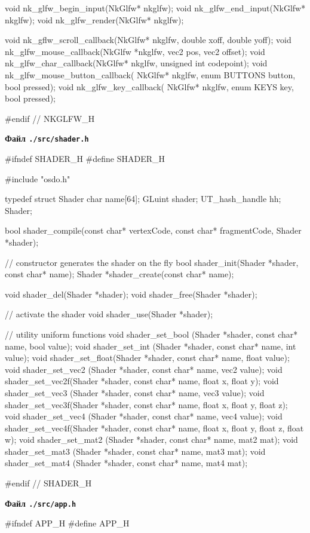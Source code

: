 \begin{multicols}{2}
\begin{ccode}
void nk_glfw_begin_input(NkGlfw* nkglfw);
void nk_glfw_end_input(NkGlfw* nkglfw);
void nk_glfw_render(NkGlfw* nkglfw);

void nk_gflw_scroll_callback(NkGlfw* nkglfw, double xoff, double yoff);
void nk_glfw_mouse_callback(NkGlfw *nkglfw, vec2 pos, vec2 offset);
void nk_glfw_char_callback(NkGlfw* nkglfw, unsigned int codepoint);
void nk_glfw_mouse_button_callback(
        NkGlfw* nkglfw, enum BUTTONS button, bool pressed);
void nk_glfw_key_callback(
        NkGlfw* nkglfw, enum KEYS key, bool pressed);

#endif // NKGLFW_H
\end{ccode}
\noindent\cprotect\textbf{Файл \verb+./src/shader.h+}
\begin{ccode}
#ifndef SHADER_H
#define SHADER_H

#include "osdo.h"

typedef struct Shader {
    char name[64];
    GLuint shader;
    UT_hash_handle hh;
} Shader;

bool shader_compile(const char* vertexCode, const char* fragmentCode,
                    Shader *shader);

// constructor generates the shader on the fly
bool shader_init(Shader *shader, const char* name);
Shader *shader_create(const char* name);

void shader_del(Shader *shader);
void shader_free(Shader *shader);

// activate the shader
void shader_use(Shader *shader);

// utility uniform functions
void shader_set_bool (Shader *shader, const char* name, bool value);
void shader_set_int  (Shader *shader, const char* name, int value);
void shader_set_float(Shader *shader, const char* name, float value);
void shader_set_vec2 (Shader *shader, const char* name, vec2 value);
void shader_set_vec2f(Shader *shader, const char* name,
                      float x, float y);
void shader_set_vec3 (Shader *shader, const char* name, vec3 value);
void shader_set_vec3f(Shader *shader, const char* name,
                      float x, float y, float z);
void shader_set_vec4 (Shader *shader, const char* name, vec4 value);
void shader_set_vec4f(Shader *shader, const char* name,
                      float x, float y, float z, float w);
void shader_set_mat2 (Shader *shader, const char* name, mat2 mat);
void shader_set_mat3 (Shader *shader, const char* name, mat3 mat);
void shader_set_mat4 (Shader *shader, const char* name, mat4 mat);

#endif // SHADER_H
\end{ccode}
\noindent\cprotect\textbf{Файл \verb+./src/app.h+}
\begin{ccode}
#ifndef APP_H
#define APP_H


\end{ccode}
\end{multicols}
